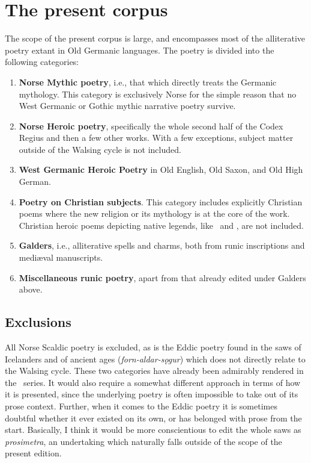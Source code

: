 \section{The present corpus}
  The scope of the present corpus is large, and encompasses most of the alliterative poetry extant in Old Germanic languages.  The poetry is divided into the following categories:
  \begin{enumerate}
    \item \textbf{Norse Mythic poetry}, i.e., that which directly treats the Germanic mythology.  This category is exclusively Norse for the simple reason that no West Germanic or Gothic mythic narrative poetry survive.
    \item \textbf{Norse Heroic poetry}, specifically the whole second half of the Codex Regius and then a few other works.  With a few exceptions, subject matter outside of the Walsing cycle is not included.
    \item \textbf{West Germanic Heroic Poetry} in Old English, Old Saxon, and Old High German.
    \item \textbf{Poetry on Christian subjects}.  This category includes explicitly Christian poems where the new religion or its mythology is at the core of the work.  Christian heroic poems depicting native legends, like \Beowulf\ and \Hildebrandslied, are not included.
    \item \textbf{Galders}, i.e., alliterative spells and charms, both from runic inscriptions and mediæval manuscripts.
    \item \textbf{Miscellaneous runic poetry}, apart from that already edited under Galders above.
  \end{enumerate}

  \subsection{Exclusions}
    All Norse Scaldic poetry is excluded, as is the Eddic poetry found in the saws of Icelanders and of ancient ages (\emph{forn-aldar-sǫgur}) which does not directly relate to the Walsing cycle.  These two categories have already been admirably rendered in the \Skp\ series.  It would also require a somewhat different approach in terms of how it is presented, since the underlying poetry is often impossible to take out of its prose context.  Further, when it comes to the Eddic poetry it is sometimes doubtful whether it ever existed on its own, or has belonged with prose from the start.  Basically, I think it would be more conscientious to edit the whole saws as \emph{prosimetra}, an undertaking which naturally falls outside of the scope of the present edition.

